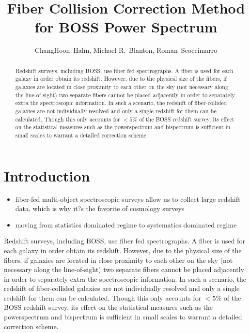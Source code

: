 \documentclass{emulateapj}
\begin{document}
\title{Fiber Collision Correction Method for BOSS Power Spectrum} 

\author{ChangHoon~Hahn, 
Michael R.~Blanton, 
Roman~Scoccimarro} 

\begin{abstract}
Redshift surveys, including BOSS, use fiber fed spectrographs. A fiber is used for each galaxy in order obtain its redshift. However, due to the physical size of the fibers, if galaxies are located in close proximity to each other on the sky (not necessary along the line-of-sight) two separate fibers cannot be placed adjacently in order to separately extra the spectroscopic information. In such a scenario, the redshift of fiber-collided galaxies are not individually resolved and only a single redshift for them can be calculated. Though this only accounts for $< 5\%$ of the BOSS redshift survey, its effect on the statistical measures such as the powerspectrum and bispectrum is sufficient in small scales to warrant a detailed correction scheme.
\end{abstract}


\section{Introduction} 
\begin{itemize}
\item fiber-fed multi-object spectroscopic surveys allow us to collect large redshift data, which is why it?s the favorite of cosmology surveys
\item moving from statistics dominated regime to systematics dominated regime
\end{itemize}

Redshift surveys, including BOSS, use fiber fed spectrographs. A fiber is used for each galaxy in order obtain its redshift. However, due to the physical size of the fibers, if galaxies are located in close proximity to each other on the sky (not necessary along the line-of-sight) two separate fibers cannot be placed adjacently in order to separately extra the spectroscopic information. In such a scenario, the redshift of fiber-collided galaxies are not individually resolved and only a single redshift for them can be calculated. Though this only accounts for $< 5\%$ of the BOSS redshift survey, its effect on the statistical measures such as the powerspectrum and bispectrum is sufficient in small scales to warrant a detailed correction scheme.
\end{document}

